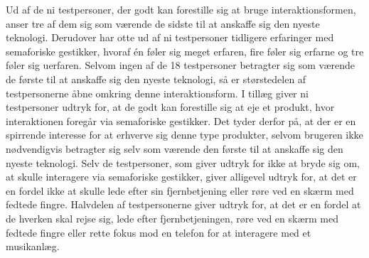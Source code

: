 Ud af de ni testpersoner, der godt kan forestille sig at bruge interaktionsformen, anser tre af dem sig som værende de sidste til at anskaffe sig den nyeste teknologi. Derudover har otte ud af ni testpersoner tidligere erfaringer med semaforiske gestikker, hvoraf én føler sig meget erfaren, fire føler sig erfarne og tre føler sig uerfaren. Selvom ingen af de 18 testpersoner betragter sig som værende de første til at anskaffe sig den nyeste teknologi, så er størstedelen af testpersonerne åbne omkring denne interaktionsform. I tillæg giver ni testpersoner udtryk for, at de godt kan forestille sig at eje et produkt, hvor interaktionen foregår via semaforiske gestikker. Det tyder derfor på, at der er en spirrende interesse for at erhverve sig denne type produkter, selvom brugeren ikke nødvendigvis betragter sig selv som værende den første til at anskaffe sig den nyeste teknologi. Selv de testpersoner, som giver udtryk for ikke at bryde sig om, at skulle interagere via semaforiske gestikker, giver alligevel udtryk for, at det er en fordel ikke at skulle lede efter sin fjernbetjening eller røre ved en skærm med fedtede fingre. Halvdelen af testpersonerne giver udtryk for, at det er en fordel at de hverken skal rejse sig, lede efter fjernbetjeningen, røre ved en skærm med fedtede fingre eller rette fokus mod en telefon for at interagere med et musikanlæg.

